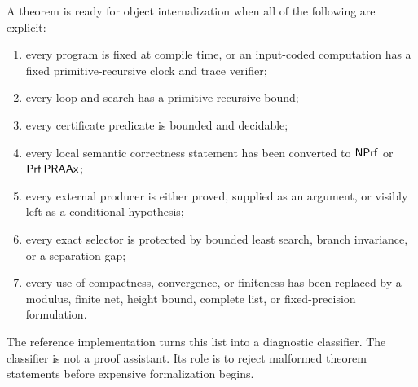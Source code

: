 A theorem is ready for object internalization when all of the following are explicit:

\begin{enumerate}
  \item every program is fixed at compile time, or an input-coded computation has a fixed primitive-recursive clock and trace verifier;
  \item every loop and search has a primitive-recursive bound;
  \item every certificate predicate is bounded and decidable;
  \item every local semantic correctness statement has been converted to \(\mathsf{NPrf}\) or \(\mathsf{Prf}\,\mathsf{PRAAx}\);
  \item every external producer is either proved, supplied as an argument, or visibly left as a conditional hypothesis;
  \item every exact selector is protected by bounded least search, branch invariance, or a separation gap;
  \item every use of compactness, convergence, or finiteness has been replaced by a modulus, finite net, height bound, complete list, or fixed-precision formulation.
\end{enumerate}

The reference implementation turns this list into a diagnostic classifier.  The classifier is not a proof assistant.  Its role is to reject malformed theorem statements before expensive formalization begins.

